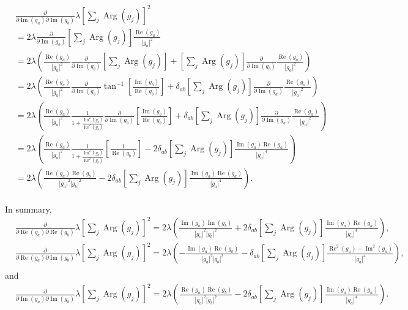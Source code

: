 \documentclass{article}
\newcommand\re{\operatorname{Re}}
\newcommand\im{\operatorname{Im}}
\begin{document}
\begin{align}
    &\frac{\partial}
    {\partial \im(g_a) \partial \im(g_b)} \lambda \left[ \sum_j \operatorname{Arg}(g_j) \right]^2 \\
    &= 2 \lambda \frac{\partial}{\partial \im(g_b)} \left[ \sum_j \operatorname{Arg}(g_j) \right] \frac{\re(g_a)}{|g_a|^2} \\
    &= 2 \lambda \left( \frac{\re(g_a)}{|g_a|^2} \frac{\partial}{\partial \im(g_b)} \left[ \sum_j \operatorname{Arg}(g_j) \right] + \left[ \sum_j \operatorname{Arg}(g_j) \right] \frac{\partial}{\partial \im(g_b)} \frac{\re(g_a)}{|g_a|^2}  \right) \\
    &= 2 \lambda \left( \frac{\re(g_a)}{|g_a|^2} \frac{\partial}{\partial \im(g_b)} \tan^{-1} \left[ \frac{\im(g_b)}{\re(g_b)} \right] + \delta_{ab} \left[ \sum_j \operatorname{Arg}(g_j) \right] \frac{\partial}{\partial \im(g_a)} \frac{\re(g_a)}{|g_a|^2}  \right) \\
    &= 2 \lambda \left( \frac{\re(g_a)}{|g_a|^2} \frac{1}{1+\frac{\im^2(g_b)}{\re^2(g_b)}} \frac{\partial}
    {\partial \im(g_b)} \left[ \frac{\im(g_b)}{\re(g_b)} \right] + \delta_{ab} \left[ \sum_j \operatorname{Arg}(g_j) \right] \frac{\partial}{\partial \im(g_a)} \frac{\re(g_a)}{|g_a|^2}  \right) \\
    &= 2 \lambda \left( \frac{\re(g_a)}{|g_a|^2} \frac{1}{1+\frac{\im^2(g_b)}{\re^2(g_b)}} \left[ \frac{1}{\re(g_b)} \right] - 2 \delta_{ab} \left[ \sum_j \operatorname{Arg}(g_j) \right] \frac{\im(g_a) \re(g_a)}{|g_a|^4}  \right) \\
    &= 2 \lambda \left( \frac{\re(g_a) \re(g_b)}{|g_a|^2 |g_b|^2} - 2 \delta_{ab} \left[ \sum_j \operatorname{Arg}(g_j) \right] \frac{\im(g_a) \re(g_a)}{|g_a|^4}  \right). \\
\end{align}

In summary,
\begin{align}
    &\frac{\partial}
    {\partial \re(g_a) \partial \re(g_b)} \lambda \left[ \sum_j \operatorname{Arg}(g_j) \right]^2 = 2 \lambda \left( \frac{\im(g_a) \im(g_b)}{|g_a|^2 |g_b|^2} + 2 \delta_{ab} \left[ \sum_j \operatorname{Arg}(g_j) \right] \frac{\im(g_a) \re(g_a)}{|g_a|^4}  \right),
\end{align}
\begin{align}
    &\frac{\partial}
    {\partial \re(g_a) \partial \im(g_b)} \lambda \left[ \sum_j \operatorname{Arg}(g_j) \right]^2 = 2 \lambda \left( - \frac{\im(g_a) \re(g_b)}{|g_a|^2 |g_b|^2} - \delta_{ab} \left[ \sum_j \operatorname{Arg}(g_j) \right] \frac{\re^2(g_a) - \im^2(g_a)}{|g_a|^4}  \right), \\
\end{align}
and
\begin{align}
    &\frac{\partial}
    {\partial \im(g_a) \partial \im(g_b)} \lambda \left[ \sum_j \operatorname{Arg}(g_j) \right]^2 = 2 \lambda \left( \frac{\re(g_a) \re(g_b)}{|g_a|^2 |g_b|^2} - 2 \delta_{ab} \left[ \sum_j \operatorname{Arg}(g_j) \right] \frac{\im(g_a) \re(g_a)}{|g_a|^4}  \right).
\end{align}
\end{document}
